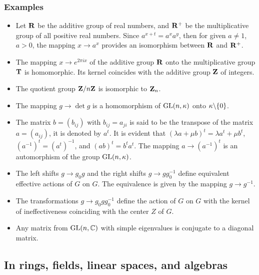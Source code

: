 \subsubsection{Examples}
\begin{itemize}
	\item Let $\mathbf{R}$ be the additive group of real numbers, and $\mathbf{R}^+$ be the multiplicative group of all positive real numbers. Since $a^{x+t}=a^xa^y$, then for given $a \ne 1$, $a>0$, the mapping $x\rightarrow a^x$ provides an isomorphism between $\mathbf{R}$ and $\mathbf{R}^+$.
	\item The mapping $x\rightarrow e^{2\pi ix}$ of the additive group $\mathbf{R}$ onto the multiplicative group $\mathbf{T}$ is homomorphic. Its kernel coincides with the additive group $\mathbf{Z}$ of integers.
	\item The quotient group $\mathbf{Z}/n\mathbf{Z}$ is isomorphic to $\mathbf{Z}_n$.
	\item The mapping $g\rightarrow\det g$ is a homomorphism of $\mathrm{GL}(n,\kappa)$ onto $\kappa\backslash\{0\}$.
	\item The matrix $b = (b_{ij})$ with $b_{ij}=a_{ji}$
	is said to be the transpose of the
	matrix $a = (a_{ij})$, it is denoted by $a^t$. It is evident that $(\lambda a+\mu b)^t=\lambda a ^t+\mu b^t$, $(a^{-1})^t=(a^t)^{-1}$, and $(ab)^t=b^ta^t$. The mapping $a\rightarrow (a^{-1})^t$ is an automorphism of the group $\mathrm{GL}(n,\kappa)$.
	\item The left shifts $g\rightarrow g_0g$ and the right shifts $g\rightarrow g g_0^{-1}$ define equivalent
	effective actions of $G$ on $G$. The equivalence is given by the mapping $g\rightarrow g^{-1}$.
	\item The transformations $g\rightarrow g_0gg_0^{-1}$ define the action of $G$ on $G$ with the kernel of
	ineffectiveness coinciding with the center $Z$ of $G$.
	\item Any matrix from $\mathrm{GL}(n, \mathbb{C})$ with simple eigenvalues is conjugate to a diagonal matrix.
\end{itemize}
\subsection{In rings, fields, linear spaces, and algebras}
